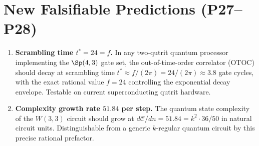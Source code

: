 \section{New Falsifiable Predictions (P27--P28)}
\label{sec:er_predictions}

\begin{enumerate}[label=\textbf{P\arabic*.},start=27]
  \item \textbf{Scrambling time $t^*=24=f$.}
        In any two-qutrit quantum processor implementing the
        $\Sp(4,3)$ gate set, the out-of-time-order correlator
        (OTOC) should decay at scrambling time
        $t^*\approx f/(2\pi)=24/(2\pi)\approx 3.8$ gate cycles,
        with the exact rational value $f=24$ controlling
        the exponential decay envelope.  Testable on
        current superconducting qutrit hardware.
  \item \textbf{Complexity growth rate $51.84$ per step.}
        The quantum state complexity of the $W(3,3)$ circuit
        should grow at $d\mathcal{C}/dn = 51.84 = k^2\cdot 36/50$
        in natural circuit units.  Distinguishable from a
        generic $k$-regular quantum circuit by this precise
        rational prefactor.
\end{enumerate}

